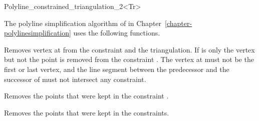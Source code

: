 \begin{ccRefClass}{Polyline_constrained_triangulation_2<Tr>}



The polyline simplification algorithm of in Chapter~\ref{chapter-polylinesimplification}
uses the following functions.

{Removes vertex at  from the constraint and the triangulation.
If  is  only the vertex but not the point is removed from the constraint .
\ccPrecond The vertex at  must not be the first or last vertex, and the line segment between the predecessor  and 
the successor  of  must not intersect any constraint.} 

{Removes the points that were kept in the constraint .}

{Removes the points that were kept in the constraints.}

\ccSeeAlso
{} \\
 \\
 \\
 \\

\end{ccRefClass}

